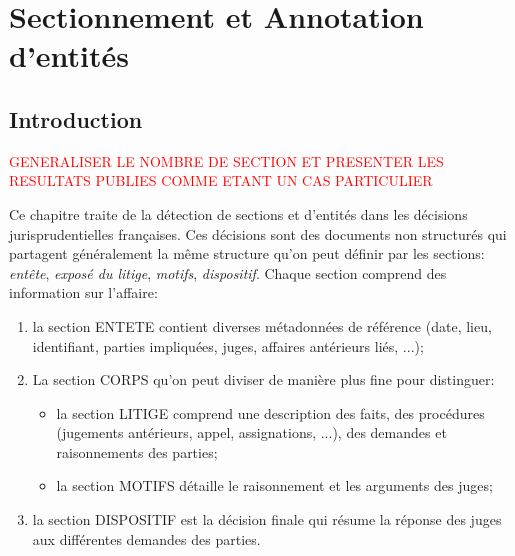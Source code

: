\chapter{Sectionnement et Annotation d'entités}
\label{chap:structuration}


\section{Introduction}
\label{sec:structuration:motivation}

\textcolor{red}{GENERALISER LE NOMBRE DE SECTION ET PRESENTER LES RESULTATS PUBLIES COMME ETANT UN CAS PARTICULIER}

Ce chapitre traite de la détection de sections et d'entités dans les décisions jurisprudentielles françaises. Ces décisions sont des documents non structurés qui partagent généralement la même structure qu'on peut définir par les sections: \textit{entête}, \textit{exposé du litige}, \textit{motifs}, \textit{dispositif}. Chaque section comprend des information sur l'affaire: 
\begin{enumerate}
\item la section ENTETE contient diverses métadonnées de référence (date, lieu, identifiant, parties impliquées, juges, affaires antérieurs liés, ...); 
\item La section CORPS qu'on peut diviser de manière plus fine pour distinguer:
\begin{itemize}
\item la section LITIGE comprend une description des faits, des procédures (jugements antérieurs, appel, assignations, ...), des demandes et raisonnements des parties; 
\item la section MOTIFS détaille le raisonnement et les arguments des juges;
\end{itemize}
\item la section DISPOSITIF est la décision finale qui résume la réponse des juges aux différentes demandes des parties.
\end{enumerate}

